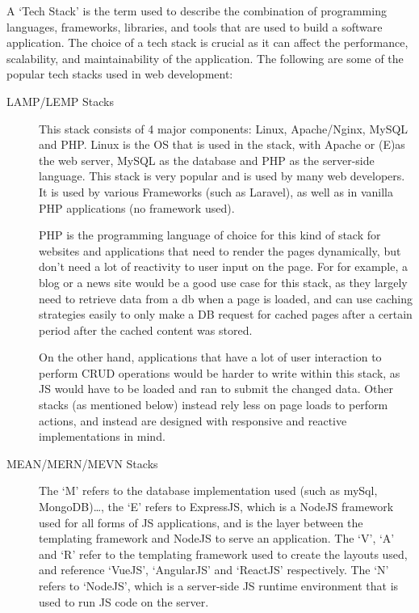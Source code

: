 \documentclass[12pt, a4paper,twoside]{report}
\theoremstyle{plain} %
\theoremstyle{definition} %
\numberwithin{equation}{chapter}
\begin{document}
A `Tech Stack' is the term used to describe the combination of programming
languages, frameworks, libraries, and tools that are used to build a software
application. The choice of a tech stack is crucial as it can affect the
performance, scalability, and maintainability of the application. The following
are some of the popular tech stacks used in web development:

\begin{description}
    \item[LAMP/LEMP Stacks] {
        This stack consists of 4 major components: Linux, Apache/Nginx, MySQL
        and PHP\@. Linux is the OS that is used in the stack, with Apache or
        (E)\@nginx as the web server, MySQL as the database and PHP as the
        server-side language. This stack is very popular and is used by many
        web developers. It is used by various Frameworks (such as Laravel), as
        well as in vanilla PHP applications (no framework used).

        PHP is the programming language of choice for this kind of stack for
        websites and applications that need to render the pages dynamically,
        but don't need a lot of reactivity to user input on the page. For
        for example, a blog or a news site would be a good use case for this
        stack, as they largely need to retrieve data from a db when a page is
        loaded, and can use caching strategies easily to only make a DB request
        for cached pages after a certain period after the cached content was stored.

        On the other hand, applications that have a lot of user interaction to perform
        CRUD operations would be harder to write within this stack, as JS would have
        to be loaded and ran to submit the changed data. Other stacks (as mentioned below)
        instead rely less on page loads to perform actions, and instead are designed
        with responsive and reactive implementations in mind.
        }
    \item[MEAN/MERN/MEVN Stacks] {
        The `M' refers to the database implementation used (such as mySql, MongoDB)\ldots,
        the `E' refers to ExpressJS, which is a NodeJS framework used for all forms of
        JS applications, and is the layer between the templating framework and NodeJS to
        serve an application. The `V', `A' and `R' refer to the templating framework used
        to create the layouts used, and reference `VueJS', `AngularJS' and `ReactJS'
        respectively. The `N' refers to `NodeJS', which is a server-side JS runtime
        environment that is used to run JS code on the server.

}
\end{description}
\end{document}
